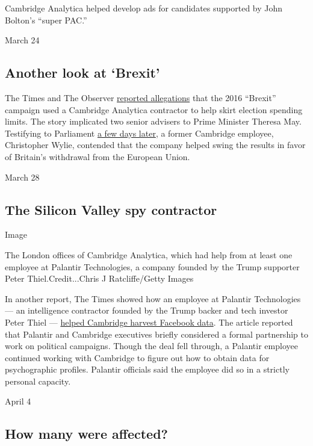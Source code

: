 Cambridge Analytica helped develop ads for candidates supported by John
Bolton's ``super PAC.''

March 24

\hypertarget{another-look-at-brexit}{%
\subsection{Another look at `Brexit'}\label{another-look-at-brexit}}

The Times and The Observer
\href{https://www.nytimes.com/2018/03/24/world/europe/uk-brexit-vote-leave-shahmir-sanni.html}{reported
allegations} that the 2016 ``Brexit'' campaign used a Cambridge
Analytica contractor to help skirt election spending limits. The story
implicated two senior advisers to Prime Minister Theresa May. Testifying
to Parliament
\href{https://www.nytimes.com/2018/03/27/world/europe/whistle-blower-data-mining-cambridge-analytica.html}{a
few days later}, a former Cambridge employee, Christopher Wylie,
contended that the company helped swing the results in favor of
Britain's withdrawal from the European Union.

March 28

\hypertarget{the-silicon-valley-spy-contractor}{%
\subsection{The Silicon Valley spy
contractor}\label{the-silicon-valley-spy-contractor}}

Image

The London offices of Cambridge Analytica, which had help from at least
one employee at Palantir Technologies, a company founded by the Trump
supporter Peter Thiel.Credit...Chris J Ratcliffe/Getty Images

In another report, The Times showed how an employee at Palantir
Technologies --- an intelligence contractor founded by the Trump backer
and tech investor Peter Thiel ---
\href{https://www.nytimes.com/2018/03/27/us/cambridge-analytica-palantir.html}{helped
Cambridge harvest Facebook data}. The article reported that Palantir and
Cambridge executives briefly considered a formal partnership to work on
political campaigns. Though the deal fell through, a Palantir employee
continued working with Cambridge to figure out how to obtain data for
psychographic profiles. Palantir officials said the employee did so in a
strictly personal capacity.

April 4

\hypertarget{how-many-were-affected}{%
\subsection{How many were affected?}\label{how-many-were-affected}}

